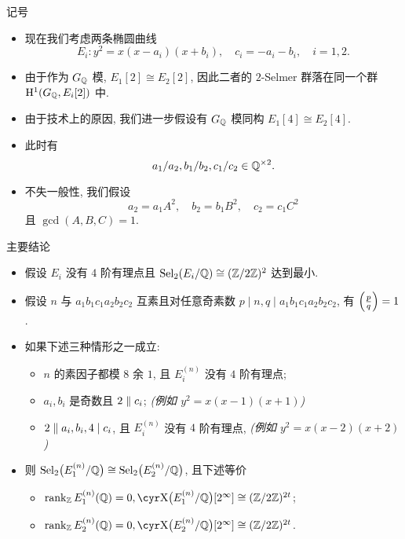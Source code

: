 \documentclass[aspectratio=169,handout]{ctexbeamer}
\begin{document}
\begin{frame}[<+->]{记号}
\begin{itemize}
\item 现在我们考虑两条椭圆曲线
\[E_i:y^2=x(x-a_i)(x+b_i),\quad c_i=-a_i-b_i,\quad i=1,2.\]
\item 由于作为 $G_{\mathbb{Q}}$ 模, $E_1[2]\cong E_2[2]$, 因此二者的 $2$-Selmer 群落在同一个群 ${\mathrm{H}}^1(G_{\mathbb{Q}},E_i[2])$ 中. 
\item 由于技术上的原因, 我们进一步假设有 $G_{\mathbb{Q}}$ 模同构 $E_1[4]\cong E_2[4]$.
\item 此时有
\[a_1/a_2,b_1/b_2,c_1/c_2\in{\mathbb{Q}}^{\times2}.\]
\item 不失一般性, 我们假设
\[a_2=a_1 A^2,\quad b_2=b_1 B^2,\quad c_2=c_1 C^2 \]
且 $\gcd(A,B,C)=1$.
\end{itemize}
\end{frame}


\begin{frame}{主要结论}
\begin{theorem}
\begin{itemize}
\item 假设 $E_i$ 没有 $4$ 阶有理点且 ${\mathrm{Sel}}_2(E_i/{\mathbb{Q}})\cong ({\mathbb{Z}}/2{\mathbb{Z}})^2$ 达到最小.
\item 假设 $n$ 与 $a_1b_1c_1a_2b_2c_2$ 互素且对任意奇素数 $p\mid n,q\mid a_1b_1c_1a_2b_2c_2$, 有 $\Bigl(\frac{{p}}{q}\Bigr)=1$.
\item 如果下述三种情形之一成立:
	\begin{itemize}
	\item $n$ 的素因子都模 $8$ 余 $1$, 且 $E_i^{(n)}$ 没有 $4$ 阶有理点;
	\item $a_i,b_i$ 是奇数且 $2\parallel c_i$; \emph{(例如 $y^2=x(x-1)(x+1)$)}
	\item $2\parallel a_i,b_i,4\mid c_i$, 且 $E_i^{(n)}$ 没有 $4$ 阶有理点, \emph{(例如 $y^2=x(x-2)(x+2)$)}
	\end{itemize}
\item 则 ${\mathrm{Sel}}_2\bigl(E_1^{(n)}/{\mathbb{Q}}\bigr)\cong {\mathrm{Sel}}_2\bigl(E_2^{(n)}/{\mathbb{Q}}\bigr)$, 
\onslide<+->
且下述等价
	\begin{itemize}
	\item $\rank_\BZ E_1^{(n)}(\BQ)=0,\Sha\bigl(E_1^{(n)}/\BQ\bigr)[2^\infty]\cong(\BZ/2\BZ)^{2t}$;
	\item $\rank_\BZ E_2^{(n)}(\BQ)=0,\Sha\bigl(E_2^{(n)}/\BQ\bigr)[2^\infty]\cong(\BZ/2\BZ)^{2t}$.
	\end{itemize}
\end{itemize}
\end{theorem}
\end{frame}
\end{document}

